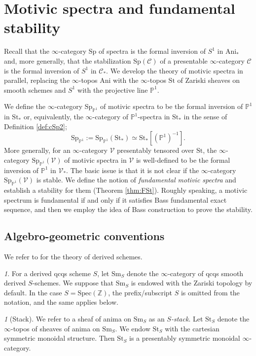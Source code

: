 \documentclass{amsart}
\theoremstyle{plain}
\theoremstyle{definition}
\theoremstyle{remark}
\newtheorem{p}[theorem]{}
\numberwithin{equation}{theorem}
\newcommand{\mcal}[1]{\mathcal{#1}}
\newcommand{\mbb}[1]{\mathbb{#1}}
\newcommand{\Ani}{\mathrm{Ani}}
\newcommand{\Sm}{\mathrm{Sm}}
\newcommand{\Sp}{\mathrm{Sp}}
\newcommand{\Spec}{\mathrm{Spec}}
\newcommand{\St}{\mathrm{St}}
\newcommand{\V}{\mathcal{V}}
\newcommand{\SpP}{\mathrm{Sp}_{\mathbb{P}^1}}
\begin{document}
\newpage

\section{Motivic spectra and fundamental stability}\label{MSp}

Recall that the $\infty$-category $\Sp$ of spectra is the formal inversion of $S^1$ in $\Ani_*$ and, more generally, that the stabilization $\Sp(\mcal{C})$ of a presentable $\infty$-category $\mcal{C}$ is the formal inversion of $S^1$ in $\mcal{C}_*$.
We develop the theory of motivic spectra in parallel, replacing the $\infty$-topos $\Ani$ with the $\infty$-topos $\St$ of Zariski sheaves on smooth schemes and $S^1$ with the projective line $\mbb{P}^1$.

We define the $\infty$-category $\SpP$ of motivic spectra to be the formal inversion of $\mbb{P}^1$ in $\St_*$ or, equivalently, the $\infty$-category of $\mbb{P}^1$-spectra in $\St_*$ in the sense of Definition \ref{def:cSp2};
\[
	\SpP := \SpP(\St_*) \simeq \St_*[(\mbb{P}^1)^{-1}].
\]
More generally, for an $\infty$-category $\V$ presentably tensored over $\St$, the $\infty$-category $\SpP(\V)$ of motivic spectra in $\V$ is well-defined to be the formal inversion of $\mbb{P}^1$ in $\V_*$.
The basic issue is that it is not clear if the $\infty$-category $\SpP(\V)$ is stable.
We define the notion of \textit{fundamental motivic spectra} and establish a stability for them (Theorem \ref{thm:FSt}).
Roughly speaking, a motivic spectrum is fundamental if and only if it satisfies Bass fundamental exact sequence, and then we employ the idea of Bass construction to prove the stability.


\subsection{Algebro-geometric conventions}\label{AGC}

We refer to \cite{SAG} for the theory of derived schemes.

\begin{p}
For a derived qcqs scheme $S$, let $\Sm_S$ denote the $\infty$-category of qcqs smooth derived $S$-schemes.
We suppose that $\Sm_S$ is endowed with the Zariski topology by default.
In the case $S=\Spec(\mbb{Z})$, the prefix/subscript $S$ is omitted from the notation, and the same applies below.
\end{p}

\begin{p}[Stack]
We refer to a sheaf of anima on $\Sm_S$ as an \textit{$S$-stack}.
Let $\St_S$ denote the $\infty$-topos of sheaves of anima on $\Sm_S$.
We endow $\St_S$ with the cartesian symmetric monoidal structure.
Then $\St_S$ is a presentably symmetric monoidal $\infty$-category.
\end{p}
\end{document}
